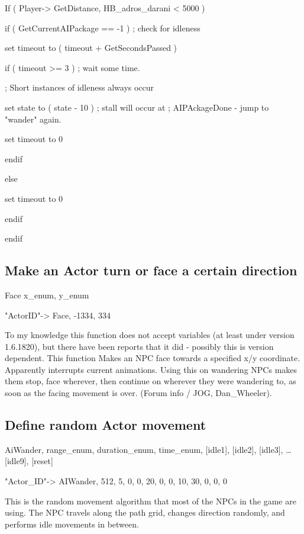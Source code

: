 If ( Player-> GetDistance, HB\_adros\_darani < 5000
)

if ( GetCurrentAIPackage == -1 ) ; check for idleness

set timeout to ( timeout + GetSecondsPassed )

if ( timeout >= 3 ) ; wait some time.

; Short instances of idleness always occur

set state to ( state - 10 ) ; stall will occur at ; AIPAckageDone - jump
to "wander" again.

set timeout to 0

endif

else

set timeout to 0

endif

endif

\hypertarget{make-an-actor-turn-or-face-a-certain-direction}{%
\subsection{Make an Actor turn or face a certain
direction}\label{make-an-actor-turn-or-face-a-certain-direction}}

Face x\_enum, y\_enum

"ActorID"-> Face, -1334, 334

To my knowledge this function does not accept variables (at least under
version 1.6.1820), but there have been reports that it did - possibly
this is version dependent. This function Makes an NPC face towards a
specified x/y coordinate. Apparently interrupts current animations.
Using this on wandering NPCs makes them stop, face wherever, then
continue on wherever they were wandering to, as soon as the facing
movement is over. (Forum info / JOG, Dan\_Wheeler).

\hypertarget{define-random-actor-movement}{%
\subsection{Define random Actor
movement}\label{define-random-actor-movement}}

AiWander, range\_enum, duration\_enum, time\_enum, {[}idle1{]},
{[}idle2{]}, {[}idle3{]}, \ldots{[}idle9{]}, {[}reset{]}

"Actor\_ID"-> AIWander, 512, 5, 0, 0, 20, 0, 0, 10, 30, 0, 0,
0

This is the random movement algorithm that most of the NPCs in the game
are using. The NPC travels along the path grid, changes direction
randomly, and performs idle movements in between.

